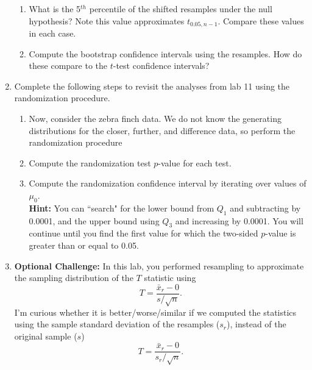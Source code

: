 \documentclass{article}\usepackage[]{graphicx}\usepackage[]{xcolor}
\begin{document}
\begin{enumerate}
\begin{enumerate}
    \item What is the 5$^{th}$ percentile of the shifted resamples under the null hypothesis? 
  Note this value approximates $t_{0.05, n-1}$. Compare these values in each case.
  \item Compute the bootstrap confidence intervals using the resamples. How do these 
  compare to the $t$-test confidence intervals?
\end{enumerate}
\item Complete the following steps to revisit the analyses from lab 11 using the
randomization procedure.
\begin{enumerate}
\item Now, consider the zebra finch data. We do not know the generating distributions
for the closer, further, and difference data, so perform the randomization procedure
  \item Compute the randomization test $p$-value for each test.
  \item Compute the randomization confidence interval by iterating over values of $\mu_0$.\\
  \textbf{Hint:} You can ``search" for the lower bound from $Q_1$ and subtracting by 0.0001, 
  and the upper bound using $Q_3$ and increasing by 0.0001. You will continue until you find 
  the first value for which the two-sided $p$-value is greater than or equal to 0.05.
\end{enumerate}
\item \textbf{Optional Challenge:} In this lab, you performed resampling to 
approximate the sampling distribution of the $T$ statistic using
\[T = \frac{\bar{x}_r - 0}{s/\sqrt{n}}.\]
I'm curious whether it is better/worse/similar if we computed the statistics
using the sample standard deviation of the resamples ($s_r$), instead of the 
original sample ($s$)
  \[T = \frac{\bar{x}_r - 0}{s_r/\sqrt{n}}.\]
\begin{enumerate}

\end{enumerate}
\end{enumerate}
\end{document}
